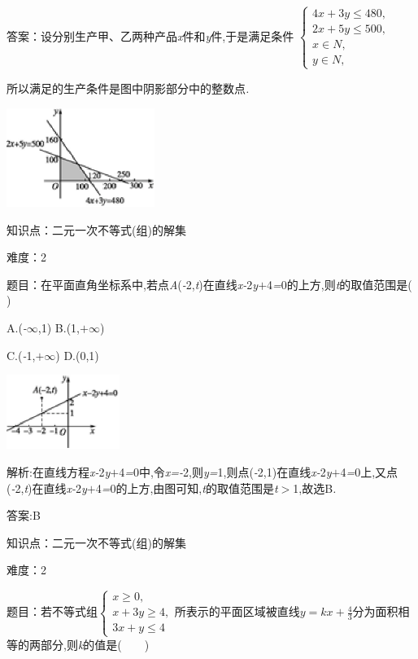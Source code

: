 \documentclass{article} %
\begin{document}
 答案：设分别生产甲、乙两种产品\textit{x}件和\textit{y}件,于是满足条件
$
\begin{cases}
4x+3y \le 480,\\
2x + 5y \le 500,\\
x \in N,\\
y \in N,
\end{cases}$


所以满足的生产条件是图中阴影部分中的整数点\textit{.}

 \includegraphics*[width=1.90in, height=1.27in, keepaspectratio=false]{image1524}


知识点：二元一次不等式(组)的解集

难度：2

 题目：在平面直角坐标系中,若点\textit{A}(\textit{-}2,\textit{t})在直线\textit{x-}2\textit{y$+$}4\textit{=}0的上方,则\textit{t}的取值范围是(\textit{　　})

 A.(\textit{-$\infty$},1) B.(1,\textit{$+\infty$})

 C.(\textit{-}1,\textit{$+\infty$}) D.(0,1)

 \includegraphics*[width=1.45in, height=0.95in, keepaspectratio=false]{image1525}

 解析:在直线方程\textit{x-}2\textit{y$+$}4\textit{=}0中,令\textit{x=-}2,则\textit{y=}1,则点(\textit{-}2,1)在直线\textit{x-}2\textit{y$+$}4\textit{=}0上,又点(\textit{-}2,\textit{t})在直线\textit{x-}2\textit{y$+$}4\textit{=}0的上方,由图可知,\textit{t}的取值范围是\textit{t$>$}1,故选B\textit{.}

 答案:B

知识点：二元一次不等式(组)的解集

难度：2

 题目：若不等式组$
\begin{cases}
x\ge 0,\\
x+3y \ge 4,\\
3x +y \le 4
\end{cases}$所表示的平面区域被直线\textit{$y=kx+\frac{4}{3}$}分为面积相等的两部分,则\textit{k}的值是(\textit{　　})
\end{document}
